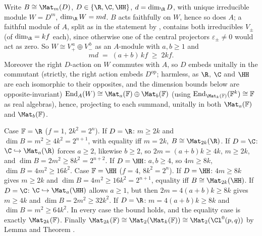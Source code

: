 Write $B \cong \Mat_m(D)$, $D \in \{\R, \C, \HH\}$, $d = \dim_\R D$, with unique irreducible module $W = D^m$, $\dim_\R W = md$. $B$ acts faithfully on $W$, hence so does $A$; a faithful module of $A$, split as in the statement by , contains both irreducibles $V_\pm$ (of $\dim_\R = kf$ each), since otherwise one of the central projectors $\varepsilon_\pm \neq 0$ would act as zero. So $W \cong V_+^{\,a} \oplus V_-^{\,b}$ as an $A$-module with $a, b \geq 1$ and
\[
md \;=\; (a + b)\,k f \;\geq\; 2kf .
\]
Moreover the right $D$-action on $W$ commutes with $A$, so $D$ embeds unitally in the commutant (strictly, the right action embeds $D^{\mathrm{op}}$; harmless, as $\R$, $\C$ and $\HH$ are each isomorphic to their opposites, and the dimension bounds below are opposite-invariant) $\mathrm{End}_A(W) \cong \Mat_a(\mathbb{F}) \oplus \Mat_b(\mathbb{F})$ (using $\mathrm{End}_{\Mat_k(\mathbb{F})}(\mathbb{F}^k) \cong \mathbb{F}$ as real algebras), hence, projecting to each summand, unitally in both $\Mat_a(\mathbb{F})$ and $\Mat_b(\mathbb{F})$.

Case $\mathbb{F} = \R$ ($f = 1$, $2k^2 = 2^n$). If $D = \R$: $m \geq 2k$ and $\dim B = m^2 \geq 4k^2 = 2^{n+1}$, with equality iff $m = 2k$, $B \cong \Mat_{2k}(\R)$. If $D = \C$: $\C \hookrightarrow \Mat_a(\R)$ forces $a \geq 2$, likewise $b \geq 2$, so $2m = (a+b)k \geq 4k$, $m \geq 2k$, and $\dim B = 2m^2 \geq 8k^2 = 2^{n+2}$. If $D = \HH$: $a, b \geq 4$, so $4m \geq 8k$, $\dim B = 4m^2 \geq 16k^2$. Case $\mathbb{F} = \HH$ ($f = 4$, $8k^2 = 2^n$). If $D = \HH$: $4m \geq 8k$ gives $m \geq 2k$ and $\dim B = 4m^2 \geq 16k^2 = 2^{n+1}$, equality iff $B \cong \Mat_{2k}(\HH)$. If $D = \C$: $\C \hookrightarrow \Mat_a(\HH)$ allows $a \geq 1$, but then $2m = 4(a+b)k \geq 8k$ gives $m \geq 4k$ and $\dim B = 2m^2 \geq 32k^2$. If $D = \R$: $m = 4(a+b)k \geq 8k$ and $\dim B = m^2 \geq 64k^2$. In every case the bound holds, and the equality case is exactly $\Mat_{2k}(\mathbb{F})$. Finally $\Mat_{2k}(\mathbb{F}) \cong \Mat_2(\Mat_k(\mathbb{F})) \cong \Mat_2(\Cl^0(p,q))$ by Lemma  and Theorem .
